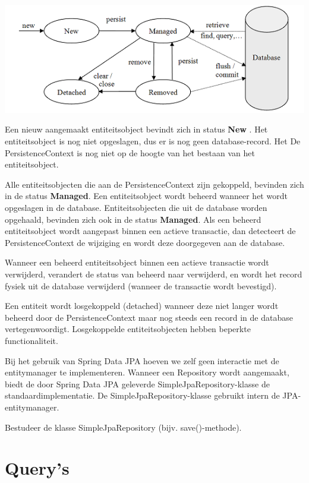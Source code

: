 \includegraphics[width=\textwidth]{./images/chapter6/entity_states}

Een nieuw aangemaakt entiteitsobject bevindt zich in status \textbf{New} . Het entiteitsobject is nog niet opgeslagen, dus er is nog geen database-record. Het De PersistenceContext is nog niet op de hoogte van het bestaan van het entiteitsobject.

Alle entiteitsobjecten die aan de PersistenceContext zijn gekoppeld, bevinden zich in de status \textbf{Managed}. Een entiteitsobject wordt beheerd wanneer het wordt opgeslagen in de database. Entiteitsobjecten die uit de database worden opgehaald, bevinden zich ook in de status \textbf{Managed}.  Als een beheerd entiteitsobject wordt aangepast binnen een actieve transactie,  dan detecteert de PersistenceContext de wijziging en wordt deze doorgegeven aan de database.

Wanneer een beheerd entiteitsobject binnen een actieve transactie wordt verwijderd, verandert de status van beheerd naar verwijderd, en wordt het record fysiek uit de database verwijderd (wanneer de transactie wordt bevestigd).

Een entiteit wordt losgekoppeld (detached) wanneer deze niet langer wordt beheerd door de PersistenceContext maar nog steeds een record in de database vertegenwoordigt. Losgekoppelde entiteitsobjecten hebben beperkte functionaliteit.

Bij het gebruik van Spring Data JPA hoeven we zelf geen interactie met de entitymanager te implementeren. Wanneer een Repository wordt aangemaakt, biedt de door Spring Data JPA geleverde SimpleJpaRepository-klasse de standaardimplementatie. De SimpleJpaRepository-klasse gebruikt intern de JPA-entitymanager.

\begin{oefening}
Bestudeer de klasse  SimpleJpaRepository (bijv. save()-methode).
\end{oefening}


\section{Query's}

